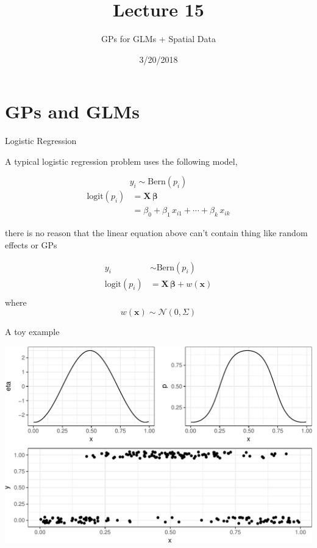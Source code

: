 \documentclass[11pt,ignorenonframetext,]{beamer}
\title{Lecture 15}
\subtitle{GPs for GLMs + Spatial Data}
\date{3/20/2018}
\begin{document}
\frame{\titlepage}

\hypertarget{gps-and-glms}{%
\section{GPs and GLMs}\label{gps-and-glms}}

\begin{frame}{Logistic Regression}
\protect\hypertarget{logistic-regression}{}

A typical logistic regression problem uses the following model,

\[y_i \sim \text{Bern}(p_i)\] \[\begin{aligned}
\text{logit}(p_i) 
  &= \symbf{X}\,\symbf{\beta} \\
  &= \beta_0 + \beta_1 \, x_{i1} + \cdots + \beta_k \, x_{ik}
\end{aligned}\]

\pause

there is no reason that the linear equation above can’t contain thing
like random effects or GPs

\[\begin{aligned}
y_i &\sim \text{Bern}(p_i) \\
\text{logit}(p_i) 
  &= \symbf{X}\,\symbf{\beta} + w(\symbf{x}) \\
\end{aligned}\] where \[ w(\symbf{x}) \sim \mathcal{N}(0,\Sigma)\]

\end{frame}

\begin{frame}{A toy example}
\protect\hypertarget{a-toy-example}{}

\begin{center}\includegraphics[width=\textwidth]{Lec15_files/figure-beamer/unnamed-chunk-1-1} \end{center}

\end{frame}
\end{document}
